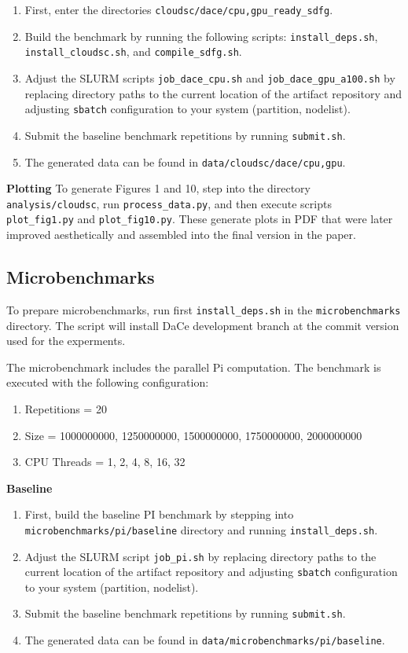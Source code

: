 \documentclass{article}
\begin{document}
\begin{enumerate}
\item First, enter the directories \texttt{cloudsc/dace/{cpu,gpu}\_ready\_sdfg}.
\item Build the benchmark by running the following scripts: \texttt{install\_deps.sh}, \texttt{install\_cloudsc.sh},
and \texttt{compile\_sdfg.sh}.
\item Adjust the SLURM scripts \texttt{job\_dace\_cpu.sh} and \texttt{job\_dace\_gpu\_a100.sh}
by replacing directory paths to the current location of the artifact repository and adjusting \texttt{sbatch}
configuration to your system (partition, nodelist).
\item Submit the baseline benchmark repetitions by running \texttt{submit.sh}.
\item The generated data can be found in \texttt{data/cloudsc/dace/{cpu,gpu}}.
\end{enumerate}

\textbf{Plotting}
%
To generate Figures 1 and 10, step into the directory \texttt{analysis/cloudsc}, run \texttt{process\_data.py},
and then execute scripts \texttt{plot\_fig1.py} and \texttt{plot\_fig10.py}. These generate plots in PDF that were
later improved aesthetically and assembled into the final version in the paper.

\subsection{Microbenchmarks}

To prepare microbenchmarks, run first \texttt{install\_deps.sh} in the \texttt{microbenchmarks} directory.
The script will install DaCe development branch at the commit version used for the experments.

The microbenchmark includes the parallel Pi computation. The benchmark is executed with the following
configuration:
\begin{enumerate}
\item Repetitions = 20
\item Size = 1000000000, 1250000000, 1500000000, 1750000000, 2000000000
\item CPU Threads = 1, 2, 4, 8, 16, 32
\end{enumerate}

\textbf{Baseline}

\begin{enumerate}
\item First, build the baseline PI benchmark by stepping into \texttt{microbenchmarks/pi/baseline} directory and running
\texttt{install\_deps.sh}.
\item Adjust the SLURM script \texttt{job\_pi.sh}
by replacing directory paths to the current location of the artifact repository and adjusting \texttt{sbatch}
configuration to your system (partition, nodelist).
\item Submit the baseline benchmark repetitions by running \texttt{submit.sh}.
\item The generated data can be found in \texttt{data/microbenchmarks/pi/baseline}.
\end{enumerate}
\end{document}

